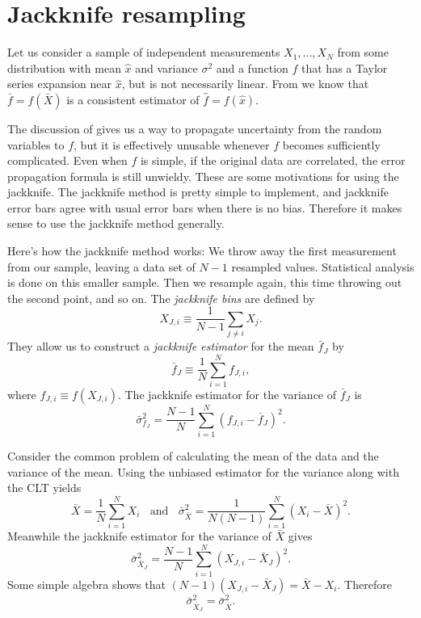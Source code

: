 \section{Jackknife resampling}
Let us consider a sample of independent measurements 
$X_1,...,X_N$ from some distribution with mean $\hat{x}$ and 
variance $\sigma^2$ and a function $f$ that has a Taylor series 
expansion near $\hat{x}$, but is not necessarily linear.
From  we know that $\bar{f}=f(\bar{X})$ is
a consistent estimator of $\hat{f}=f(\hat{x})$. 

The discussion of  gives us a way to propagate 
uncertainty from the random variables to $f$, but it is effectively 
unusable whenever $f$ becomes sufficiently complicated. 
Even when $f$ is simple, if the original data are correlated, the 
error propagation formula  is still 
unwieldy. These are some motivations for using the jackknife.
The jackknife method is pretty simple to implement, and jackknife error 
bars agree with usual error bars when there is no bias.
Therefore it makes sense to use the jackknife method generally. 

Here's how the jackknife method works: We throw away the first measurement 
from our sample, leaving a data set of $N-1$ resampled values. Statistical
analysis is done on this smaller sample. Then we resample again, this time
throwing out the second point, and so on.
The {\it jackknife bins} are defined by
\begin{equation}
  X_{J,i}\equiv\frac{1}{N-1}\sum_{j\neq i}X_j.
\end{equation}
They allow us to construct a {\it jackknife estimator}
 for the mean $\bar{f}_J$ by
\begin{equation}\label{eq:jackmean}
  \bar{f}_J\equiv\frac{1}{N}\sum_{i=1}^N f_{J,i},
\end{equation}
where $f_{J,i}\equiv f(X_{J,i})$. The jackknife estimator for the 
variance of $\bar{f}_J$ is
\begin{equation}\label{eq:jackvar}
  \bar\sigma^2_{f_J}=\frac{N-1}{N}\sum_{i=1}^N(f_{J,i}-\bar{f}_J)^2.
\end{equation}
\begin{example*}{}{}
  Consider the common problem of calculating the mean of the data and
  the variance of the mean. Using the unbiased estimator for the variance
  along with the CLT yields
  \begin{equation}
    \bar{X}=\frac{1}{N}\sum_{i=1}^N X_i~~~~\text{and}~~~~
     \bar{\sigma}^2_{\bar{X}}=\frac{1}{N(N-1)}\sum_{i=1}^N(X_i-\bar{X})^2.
  \end{equation}
  Meanwhile the jackknife estimator for the variance of $\bar{X}$ gives
  \begin{equation}
    \bar\sigma_{\bar{X}_J}^2=\frac{N-1}{N}\sum_{i=1}^N(X_{J,i}-\bar{X}_J)^2.
  \end{equation}
  Some simple algebra shows that $(N-1)(X_{J,i}-\bar{X}_J)=\bar{X}-X_i$.
  Therefore
  \begin{equation}
    \bar\sigma_{\bar{X}_J}^2=\bar{\sigma}^2_{\bar{X}}.
  \end{equation}
\end{example*}

